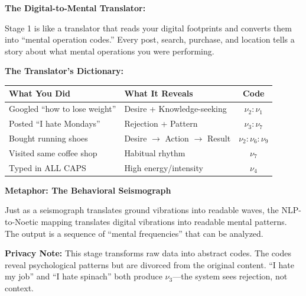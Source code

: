 \documentclass[11pt,twoside]{book}
\newcommand{\noe}[1]{\nu_{#1}}
\begin{document}
\begin{tcolorbox}[colback=green!5!white,colframe=green!65!black,title=\textbf{Plain English: What Stage 1 Does},breakable]

\textbf{The Digital-to-Mental Translator:}

Stage 1 is like a translator that reads your digital footprints and converts them into ``mental operation codes.'' Every post, search, purchase, and location tells a story about what mental operations you were performing.

\textbf{The Translator's Dictionary:}

\begin{center}
\footnotesize
\begin{tabularx}{\textwidth}{l|X|c}
\toprule
\textbf{What You Did} & \textbf{What It Reveals} & \textbf{Code} \\
\midrule
Googled ``how to lose weight'' & Desire + Knowledge-seeking & $\noe{2}:\noe{1}$ \\
Posted ``I hate Mondays'' & Rejection + Pattern & $\noe{3}:\noe{7}$ \\
Bought running shoes & Desire $\to$ Action $\to$ Result & $\noe{2}:\noe{6}:\noe{9}$ \\
Visited same coffee shop & Habitual rhythm & $\noe{7}$ \\
Typed in ALL CAPS & High energy/intensity & $\noe{4}$ \\
\bottomrule
\end{tabularx}
\end{center}

\textbf{Metaphor: The Behavioral Seismograph}

Just as a seismograph translates ground vibrations into readable waves, the NLP-to-Noetic mapping translates digital vibrations into readable mental patterns. The output is a sequence of ``mental frequencies'' that can be analyzed.

\textbf{Privacy Note:} This stage transforms raw data into abstract codes. The codes reveal psychological patterns but are divorced from the original content. ``I hate my job'' and ``I hate spinach'' both produce $\noe{3}$---the system sees rejection, not context.

\end{tcolorbox}

\end{document}
